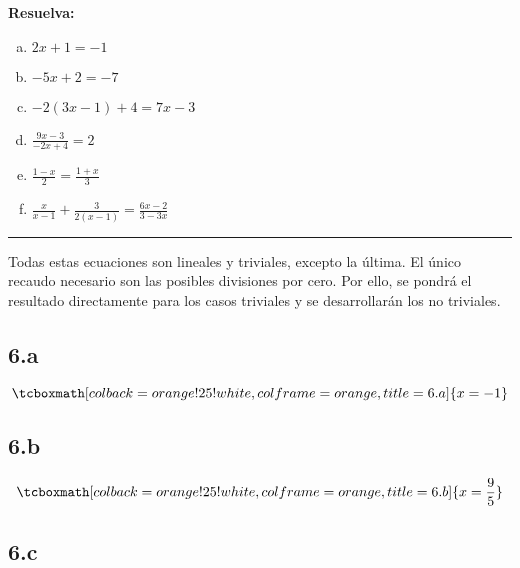 \documentclass{article}
\begin{document}
\textbf{Resuelva:}

\begin{enumerate}[(a)]
\bfseries

\item $ 2x + 1 = -1 $

\item $ -5x + 2 = -7 $

\item $ -2(3x-1) + 4 = 7x -3 $

\item $ \frac{9x - 3}{-2x + 4} = 2 $

\item $ \frac{1-x}{2} = \frac{1 + x}{3} $

\item $ \frac{x}{x-1} + \frac{3}{2(x-1)} = \frac{6x-2}{3-3x} $

\end{enumerate}
\hrule
\vspace{1em}
Todas estas ecuaciones son lineales y triviales, excepto la última. El único recaudo necesario son las posibles divisiones por cero. Por ello, se pondrá el resultado directamente para los casos triviales y se desarrollarán los no triviales.

\subsection*{6.a}
\label{subsec:6.a}

\begin{equation}
\tcboxmath[colback=orange!25!white,colframe=orange, title=6.a] { x = -1 }
\end{equation}

\subsection*{6.b}
\label{subsec:6.b}

\begin{equation}
\tcboxmath[colback=orange!25!white,colframe=orange, title=6.b] { x = \frac{9}{5} }
\end{equation}

\subsection*{6.c}
\label{subsec:6.c}
\end{document}
